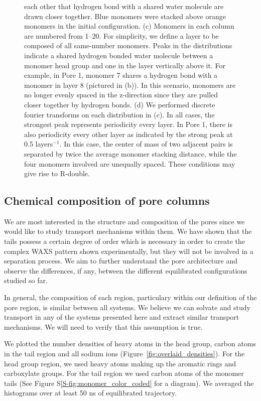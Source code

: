 \documentclass[journal=jpcbfk,manusciprt=article]{achemso}
\begin{document}
\begin{figure}[!htb]
{  each other that hydrogen bond with a shared water molecule are drawn closer
  together. Blue monomers were stacked above orange monomers in the initial configuration.
  (c) Monomers in each column are numbered from 1--20. For simplicity, we define a layer to
  be composed of all same-number monomers. Peaks in the distributions indicate
  a shared hydrogen bonded water molecule between a monomer head group and one in the layer
  vertically above it. For example, in Pore 1, monomer 7 shares a hydrogen bond with
  a monomer in layer 8 (pictured in (b)). In this scenario, monomers are no longer evenly
  spaced in the z-direction since they are pulled closer together by hydrogen bonds. 
  (d) We performed discrete fourier transforms on each distribution in (c). In all cases,
  the strongest peak represents periodicity every layer. In Pore 1, there is also periodicity
  every other layer as indicated by the strong peak at 0.5 layers$^{-1}$. In this case, the
  center of mass of two adjacent pairs is separated by twice the average monomer stacking 
  distance, while the four monomers involved are unequally spaced. These conditions may
  give rise to R-double.}\label{fig:hbonds}
  \end{figure}
  
  \subsection{Chemical composition of pore columns}

  We are most interested in the structure and composition of the pores since we would like to study
  transport mechanisms within them. We have shown that the tails possess a certain degree of order
  which is necessary in order to create the complex WAXS pattern shown experimentally, but
  they will not be involved in a separation process. We aim to further understand the pore
  architecture and observe the differences, if any, between the different equilibrated
  configurations studied so far.

  In general, the composition of each region, particulary within our definition of 
  the pore region, is similar between all systems. We believe we can solvate and study transport
  in any of the systems presented here and extract similar transport mechanisms. We will 
  need to verify that this assumption is true. 
  
  We plotted the number densities of heavy atoms in the head group, carbon atoms in the tail
  region and all sodium ions (Figure~\ref{fig:overlaid_densities}). For the head group
  region, we used heavy atoms making up the aromatic rings and carboxylate groups. For the tail
  region we used carbon atoms of the monomer tails (See Figure S\ref{S-fig:monomer_color_coded}
  for a diagram). We averaged the histograms over at least 50 ns of equilibrated trajectory.
\end{document}
